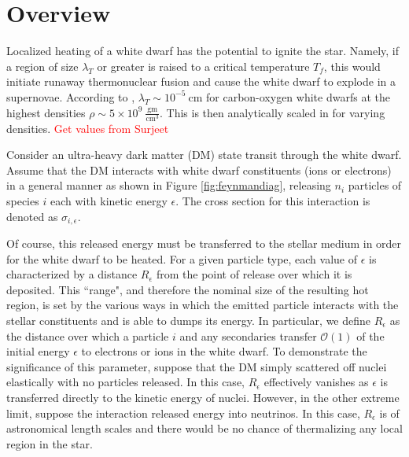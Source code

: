\documentclass[twocolumn,showpacs,preprintnumbers,amsmath,amssymb,prl]{revtex4}
\newcommand{\OO}{\mathcal{O}}
\begin{document}
\section{Overview}

Localized heating of a white dwarf has the potential to ignite the star. Namely, if a region of size $\lambda_T$ or greater is raised to a critical temperature $T_f$, this would initiate runaway thermonuclear fusion and cause the white dwarf to explode in a supernovae. According to \cite{Woosley}, $\lambda_T \sim 10^{-5} ~\text{cm}$ for carbon-oxygen white dwarfs at the highest densities $\rho \sim 5 \times 10^9 ~\frac{\text{gm}}{\text{cm}^3}$. This is then analytically scaled in \cite{Varela} for varying densities. \textcolor{red}{Get values from Surjeet}

Consider an ultra-heavy dark matter (DM) state transit through the white dwarf. Assume that the DM interacts with white dwarf constituents (ions or electrons) in a general manner as shown in Figure \ref{fig:feynmandiag}, releasing $n_i$ particles of species $i$ each with kinetic energy $\epsilon$. The cross section for this interaction is denoted as $\sigma_{i,\epsilon}$.  

Of course, this released energy must be transferred to the stellar medium in order for the white dwarf to be heated. For a given particle type, each value of $\epsilon$ is characterized by a distance $R_\epsilon$ from the point of release over which it is deposited. This ``range", and therefore the nominal size of the resulting hot region, is set by the various ways in which the emitted particle interacts with the stellar constituents and is able to dumps its energy. In particular, we define $R_\epsilon$ as the distance over which a particle $i$ and any secondaries transfer $\OO(1)$ of the initial energy $\epsilon$ to electrons or ions in the white dwarf. To demonstrate the significance of this parameter, suppose that the DM simply scattered off nuclei elastically with no particles released. In this case, $R_\epsilon$ effectively vanishes as $\epsilon$ is transferred directly to the kinetic energy of nuclei. However, in the other extreme limit, suppose the interaction released energy into neutrinos. In this case, $R_\epsilon$ is of astronomical length scales and there would be no chance of thermalizing any local region in the star. 
\end{document}
